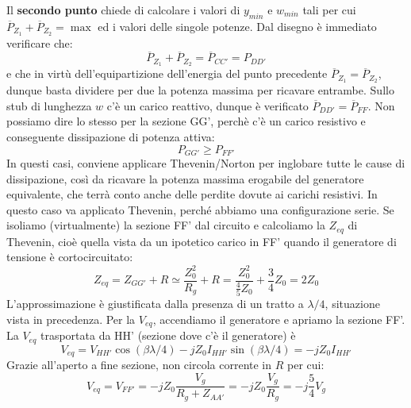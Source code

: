 \documentclass{book}
\begin{document}
        Il \textbf{secondo punto} chiede di calcolare i valori di $y_{min}$ e $w_{min}$ tali per cui
        $\overline{P}_{Z_{1}}+\overline{P}_{Z_{2}}=\max$ ed i valori delle singole potenze. Dal disegno è immediato verificare che:
        \begin{equation}
            \overline{P}_{Z_{1}}+\overline{P}_{Z_{2}}=\overline{P}_{CC'} =P_{DD'}
        \end{equation}
        e che in virtù dell'equipartizione dell'energia del punto precedente $\overline{P}_{Z_{1}}=\overline{P}_{Z_{2}}$, dunque basta dividere per due 
        la potenza massima per ricavare entrambe. Sullo stub di lunghezza $w$ c'è un carico reattivo, dunque è verificato $\overline{P}_{DD'}=\overline{P}_{FF}$.
        Non possiamo dire lo stesso per la sezione GG', perchè c'è un carico resistivo e conseguente dissipazione di potenza attiva:
        \begin{equation}
            P_{GG'}\geq P_{FF'}
        \end{equation}
        In questi casi, conviene applicare Thevenin/Norton per inglobare tutte le cause di dissipazione, così da ricavare la potenza 
        massima erogabile del generatore equivalente, che terrà conto anche delle perdite dovute ai carichi resistivi. In 
        questo caso va applicato Thevenin, perché abbiamo una configurazione serie. Se isoliamo (virtualmente) la sezione FF' dal circuito
        e calcoliamo la $Z_{eq}$ di Thevenin, cioè quella vista da un ipotetico carico in FF' quando il generatore di tensione è cortocircuitato:
        \begin{equation}
            Z_{eq}=Z_{GG'}+R \simeq \frac{Z_{0} ^{2}}{R_{g}}+R = \frac{Z^{2} _{0}}{\displaystyle \frac{4}{5}Z_{0}}+\frac{3}{4}Z_{0}=2Z_{0}
        \end{equation}
        L'approssimazione è giustificata dalla presenza di un tratto a $\lambda/4$, situazione vista in precedenza.
        Per la $V_{eq}$, accendiamo il generatore e apriamo la sezione FF'. La $V_{eq}$ trasportata da HH' (sezione dove c'è il generatore) è 
        \begin{equation}
            V_{eq}=V_{HH'}\cos(\beta \lambda /4)-jZ_{0}I_{HH'}\sin(\beta \lambda /4) = -jZ_{0}I_{HH'} 
        \end{equation}
        Grazie all'aperto a fine sezione, non circola corrente in $R$ per cui:
        \begin{equation}
            V_{eq}=V_{FF'}=-jZ_{0}\frac{V_{g}}{R_{g}+Z_{AA'}} = -jZ_{0}\frac{V_{g}}{R_{g}} = -j\frac{5}{4}V_{g}
        \end{equation}
\end{document}

